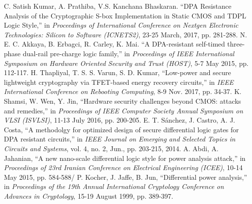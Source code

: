 \documentclass[conference, 12pt]{IEEEtran}
\begin{document}
	\begin{thebibliography}{00}
		 C. Satish Kumar, A. Prathiba, V.S. Kanchana Bhaskaran. ``DPA Resistance Analysis of the Cryptographic S-box Implementation in Static CMOS and TDPL Logic Style,'' in \textit{Proceedings of International Conference on Nextgen Electronic Technologies: Silicon to Software (ICNETS2)}, 23-25 March, 2017, pp. 281-288.
		 N. E. C. Akkaya, B. Erbagci, R. Carley, K. Mai. ``A DPA-resistant self-timed three-phase dual-rail pre-charge logic family,'' in \textit{Proceedings of IEEE International Symposium on Hardware Oriented Security and Trust (HOST)}, 5-7 May 2015, pp. 112-117.
		 H. Thapliyal, T. S. S. Varun, S. D. Kumar, ``Low-power and secure lightweight cryptography via TFET-based energy recovery circuits,'' in \textit{IEEE International Conference on Rebooting Computing}, 8-9 Nov. 2017, pp. 34-37.
		 K. Shamsi, W. Wen, Y. Jin, ``Hardware security challenges beyond CMOS: attacks and remedies,'' in \textit{Proceedings of IEEE Computer Society Annual Symposium on VLSI (ISVLSI)}, 11-13 July 2016, pp. 200-205.
		 E. T. Sánchez, J. Castro, A. J. Costa, ``A methodolgy for optimized design of secure differential logic gates for DPA resistant circuits,'' in \textit{IEEE Journal on Emerging and Selected Topics in Circuits and Systems}, vol. 4, no. 2, Jun., pp. 203-215, 2014.
		 A. Abdi, A. Jahanian, ``A new nano-scale differential logic style for power analysis attack,'' in \textit{Proceedings of 23rd Iranian Conference on Electrical Engineering (ICEE)}, 10-14 May 2015, pp. 584-588/
		 P. Kocher, J. Jaffe, B. Jun, ``Differential power analysis,'' in \textit{Proceedings of the 19th Annual International Cryptology Conference on Advances in Cryptology}, 15-19 August 1999, pp. 389-397.
	\end{thebibliography}
\end{document}
